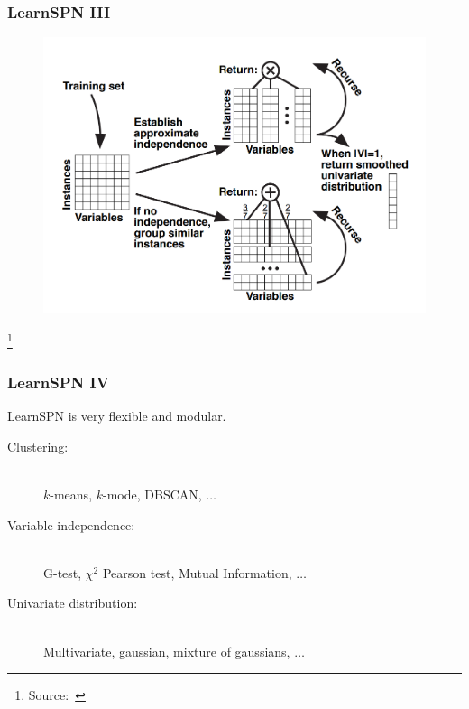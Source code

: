 \documentclass[usenames,dvipsnames]{beamer}
\newcommand\blfootnote[1]{%
  \begingroup
  \renewcommand\thefootnote{}\footnote{#1}%
  \addtocounter{footnote}{-1}%
  \endgroup
}
\begin{document}
\begin{frame}
  \frametitle{LearnSPN III}

  \begin{figure}
    \centering\includegraphics[height=0.85\textheight]{imgs/learnspn.png}
  \end{figure}\vspace{-0.5cm}
  \blfootnote{Source:~\cite{gens-domingos}}
\end{frame}

\begin{frame}
  \frametitle{LearnSPN IV}

  LearnSPN is very flexible and modular.

  \begin{description}
    \item[Clustering:]~\\
      $k$-means, $k$-mode, DBSCAN, $\ldots$
    \item[Variable independence:]~\\
      G-test, $\chi^2$ Pearson test, Mutual Information, $\ldots$
    \item[Univariate distribution:]~\\
      Multivariate, gaussian, mixture of gaussians, $\ldots$
  \end{description}
\end{frame}
\end{document}
